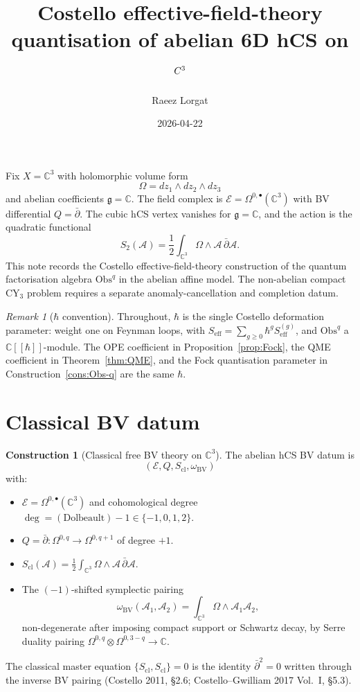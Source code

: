 \documentclass[11pt]{amsart}
\title{Costello effective-field-theory quantisation of abelian 6D hCS on $\C^3$}
\author{Raeez Lorgat}
\date{2026-04-22}
\providecommand{\C}{\mathbb{C}}
\providecommand{\dbar}{\bar{\partial}}
\providecommand{\g}{\mathfrak{g}}
\providecommand{\BV}{\mathrm{BV}}
\providecommand{\Obs}{\mathrm{Obs}}
\providecommand{\cE}{\mathcal{E}}
\providecommand{\cA}{\mathcal{A}}
\providecommand{\eff}{\mathrm{eff}}
\providecommand{\cl}{\mathrm{cl}}
\theoremstyle{plain}
\theoremstyle{definition}
\newtheorem{construction}[theorem]{Construction}
\theoremstyle{remark}
\newtheorem{remark}[theorem]{Remark}
\begin{document}
\maketitle

Fix $X=\C^3$ with holomorphic volume form
\[
  \Omega=dz_1\wedge dz_2\wedge dz_3
\]
and abelian coefficients $\g=\C$. The field complex is
$\cE=\Omega^{0,\bullet}(\C^3)$ with BV differential $Q=\dbar$. The cubic
hCS vertex vanishes for $\g=\C$, and the action is the quadratic
functional
\[
  S_2(\cA)=\frac12\int_{\C^3}\Omega\wedge\cA\,\dbar\cA .
\]
This note records the Costello effective-field-theory construction of
the quantum factorisation algebra $\Obs^q$ in the abelian affine model.
The non-abelian compact CY$_3$ problem requires a separate
anomaly-cancellation and completion datum.

\begin{remark}[$\hbar$ convention]\label{rmk:hbar}
Throughout, $\hbar$ is the single Costello deformation parameter:
weight one on Feynman loops, with
$S_\eff=\sum_{g\geq0}\hbar^gS_\eff^{(g)}$, and $\Obs^q$ a
$\C[[\hbar]]$-module. The OPE coefficient in
Proposition~\ref{prop:Fock}, the QME coefficient in
Theorem~\ref{thm:QME}, and the Fock quantisation parameter in
Construction~\ref{cons:Obs-q} are the same $\hbar$.
\end{remark}

\section{Classical BV datum}

\begin{construction}[Classical free BV theory on $\C^3$]
\label{cons:classical-BV}
The abelian hCS BV datum is
\[
  (\cE,Q,S_\cl,\omega_\BV)
\]
with:
\begin{itemize}
\item $\cE=\Omega^{0,\bullet}(\C^3)$ and cohomological degree
$\deg=(\text{Dolbeault})-1\in\{-1,0,1,2\}$.
\item $Q=\dbar:\Omega^{0,q}\to\Omega^{0,q+1}$ of degree $+1$.
\item $S_\cl(\cA)=\tfrac12\int_{\C^3}\Omega\wedge\cA\,\dbar\cA$.
\item The $(-1)$-shifted symplectic pairing
\[
  \omega_\BV(\cA_1,\cA_2)
  =
  \int_{\C^3}\Omega\wedge\cA_1\cA_2,
\]
non-degenerate after imposing compact support or Schwartz decay, by
Serre duality pairing
$\Omega^{0,q}\otimes\Omega^{0,3-q}\to\C$.
\end{itemize}
The classical master equation $\{S_\cl,S_\cl\}=0$ is the identity
$\dbar^2=0$ written through the inverse BV pairing
(Costello 2011, \S2.6; Costello--Gwilliam 2017 Vol.~I, \S5.3).
\end{construction}
\end{document}
